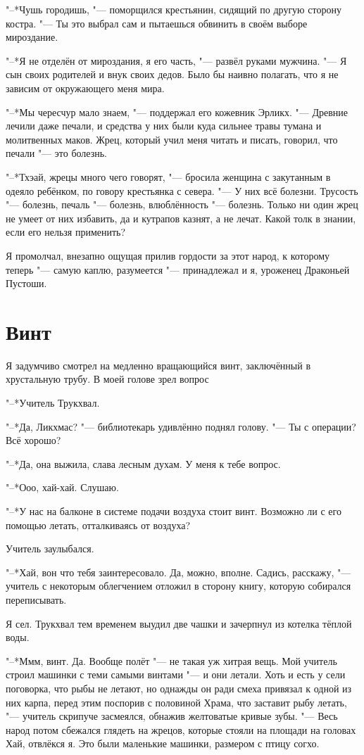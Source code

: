 \documentclass[a4paper,10pt]{book}
\newcommand{\ldotst}{\so{...}\xspace}
\begin{document}
"--*Чушь городишь, "--- поморщился крестьянин, сидящий по другую сторону 
костра. "--- Ты это выбрал сам и пытаешься обвинить в своём выборе мироздание.

"--*Я не отделён от мироздания, я его часть, "--- развёл руками мужчина. "--- Я 
сын своих родителей и внук своих дедов. Было бы наивно полагать, что я не 
зависим от окружающего меня мира.

"--*Мы чересчур мало знаем, "--- поддержал его кожевник Эрликх. "--- Древние 
лечили даже печали, и средства у них были куда сильнее травы тумана и 
молитвенных маков. Жрец, который учил меня читать и писать, говорил, что печали 
"--- это болезнь.

"--*Тхэай, жрецы много чего говорят, "--- бросила женщина с закутанным в одеяло 
ребёнком, по говору крестьянка с севера. "--- У них всё болезни. Трусость "--- 
болезнь, печаль "--- болезнь, влюблённость "--- болезнь. Только ни один жрец не 
умеет от них избавить, да и кутрапов казнят, а не лечат. Какой толк в знании, 
если его нельзя применить?

Я промолчал, внезапно ощущая прилив гордости за этот народ, к которому теперь 
"--- самую каплю, разумеется "--- принадлежал и я, уроженец Драконьей Пустоши.

\section{Винт}

Я задумчиво смотрел на медленно вращающийся винт, 
заключённый в хрустальную трубу. В моей голове зрел вопрос\ldotst

"--*Учитель Трукхвал.

"--*Да, Ликхмас? "--- библиотекарь удивлённо поднял голову. "--- Ты с операции? 
Всё хорошо?

"--*Да, она выжила, слава лесным духам. У меня к тебе вопрос.

"--*Ооо, хай-хай. Слушаю.

"--*У нас на балконе в системе подачи воздуха стоит винт. Возможно ли с его 
помощью летать, отталкиваясь от воздуха?

Учитель заулыбался.

"--*Хай, вон что тебя заинтересовало. Да, можно, вполне. Садись, расскажу, "--- 
учитель с некоторым облегчением отложил в сторону книгу, которую собирался 
переписывать.

Я сел. Трукхвал тем временем выудил две чашки и зачерпнул из котелка тёплой 
воды.

"--*Ммм, винт. Да. Вообще полёт "--- не такая уж хитрая вещь. Мой учитель 
строил 
машинки с теми самыми винтами "--- и они летали. Хоть и есть у сели поговорка, 
что рыбы не летают, но однажды он ради смеха привязал к одной из них карпа, 
перед этим поспорив с половиной Храма, что заставит рыбу летать, "--- учитель 
скрипуче засмеялся, обнажив желтоватые кривые зубы. "--- Весь народ потом 
сбежался глядеть на жрецов, которые стояли на площади на головах\ldotst Хай, 
отвлёкся я. Это были маленькие машинки, размером с птицу согхо.
\end{document}
